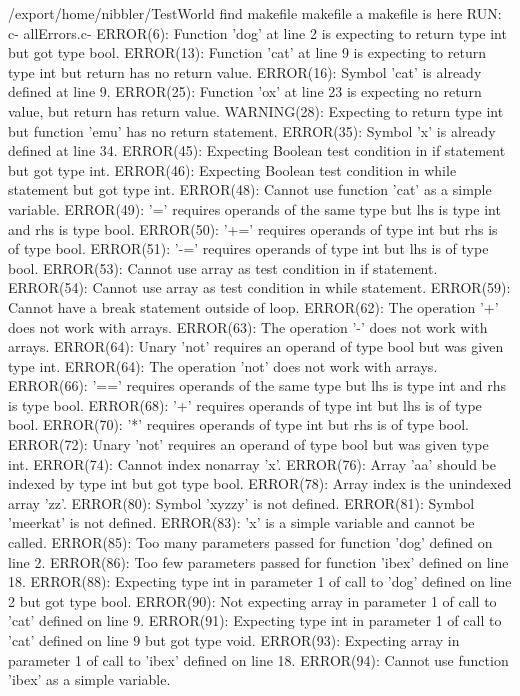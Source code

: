 \documentclass[12pt]{book}
\begin{document}
/export/home/nibbler/TestWorld
find makefile
makefile
a makefile is here
RUN: c- allErrors.c-
ERROR(6): Function 'dog' at line 2 is expecting to return type int but got type bool.
ERROR(13): Function 'cat' at line 9 is expecting to return type int but return has no return value.
ERROR(16): Symbol 'cat' is already defined at line 9.
ERROR(25): Function 'ox' at line 23 is expecting no return value, but return has return value.
WARNING(28): Expecting to return type int but function 'emu' has no return statement.
ERROR(35): Symbol 'x' is already defined at line 34.
ERROR(45): Expecting Boolean test condition in if statement but got type int.
ERROR(46): Expecting Boolean test condition in while statement but got type int.
ERROR(48): Cannot use function 'cat' as a simple variable.
ERROR(49): '=' requires operands of the same type but lhs is type int and rhs is type bool.
ERROR(50): '+=' requires operands of type int but rhs is of type bool.
ERROR(51): '-=' requires operands of type int but lhs is of type bool.
ERROR(53): Cannot use array as test condition in if statement.
ERROR(54): Cannot use array as test condition in while statement.
ERROR(59): Cannot have a break statement outside of loop.
ERROR(62): The operation '+' does not work with arrays.
ERROR(63): The operation '-' does not work with arrays.
ERROR(64): Unary 'not' requires an operand of type bool but was given type int.
ERROR(64): The operation 'not' does not work with arrays.
ERROR(66): '==' requires operands of the same type but lhs is type int and rhs is type bool.
ERROR(68): '+' requires operands of type int but lhs is of type bool.
ERROR(70): '*' requires operands of type int but rhs is of type bool.
ERROR(72): Unary 'not' requires an operand of type bool but was given type int.
ERROR(74): Cannot index nonarray 'x'.
ERROR(76): Array 'aa' should be indexed by type int but got type bool.
ERROR(78): Array index is the unindexed array 'zz'.
ERROR(80): Symbol 'xyzzy' is not defined.
ERROR(81): Symbol 'meerkat' is not defined.
ERROR(83): 'x' is a simple variable and cannot be called.
ERROR(85): Too many parameters passed for function 'dog' defined on line 2.
ERROR(86): Too few parameters passed for function 'ibex' defined on line 18.
ERROR(88): Expecting type int in parameter 1 of call to 'dog' defined on line 2 but got type bool.
ERROR(90): Not expecting array in parameter 1 of call to 'cat' defined on line 9.
ERROR(91): Expecting type int in parameter 1 of call to 'cat' defined on line 9 but got type void.
ERROR(93): Expecting array in parameter 1 of call to 'ibex' defined on line 18.
ERROR(94): Cannot use function 'ibex' as a simple variable.
\end{document}
